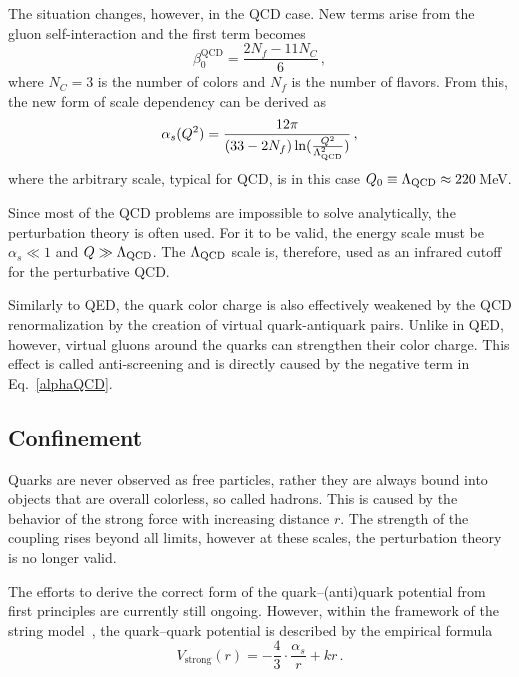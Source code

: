 The situation changes, however, in the QCD case. New terms arise from the gluon self-interaction and the first term becomes
\begin{equation}
 \beta_0^\mathrm{QCD} =  \frac{2N_f - 11N_C}{6}\,,
\end{equation}
where $N_C = 3$ is the number of colors and $N_f$ is the number of flavors. From this, the new form of scale dependency can be derived as 
\begin{equation} \label{alphaQCD}
 \alpha_s(Q^2) = \frac{12\pi}{(33 - 2 N_f) \ln (\frac{Q^2}{\Lambda_\mathrm{QCD}^2})}\,,
\end{equation}
where the arbitrary scale, typical for QCD, is in this case $Q_0 \equiv \Lambda_\mathrm{QCD} \approx 220\,$MeV\@.

Since most of the QCD problems are impossible to solve analytically, the perturbation theory is often used. For it to be valid, the energy scale must be $\alpha_s \ll 1$ and $Q \gg \Lambda_\mathrm{QCD}$\@. The $\Lambda_\mathrm{QCD}$ scale is, therefore, used as an infrared cutoff for the perturbative QCD\@.

Similarly to QED, the quark color charge is also effectively weakened by the QCD renormalization by the creation of virtual quark-antiquark pairs. Unlike in QED, however, virtual gluons around the quarks can strengthen their color charge. This effect is called anti-screening and is directly caused by the negative term in Eq.\ \eqref{alphaQCD}\@.






\subsection{Confinement\label{confinement}}

Quarks are never observed as free particles, rather they are always bound into objects that are overall colorless, so called hadrons. This is caused by the behavior of the strong force with increasing distance $r$\@. The strength of the coupling rises beyond all limits, however at these scales, the perturbation theory is no longer valid.

The efforts to derive the correct form of the quark--(anti)quark potential from first principles are currently still ongoing. However, within the framework of the string model~\cite{LundString}, the quark--quark potential is described by the empirical formula
\begin{equation} \label{strongV}
 V_\mathrm{strong} (r) = - \frac{4}{3} \cdot \frac{\alpha_s}{r} + kr\,.
\end{equation}

